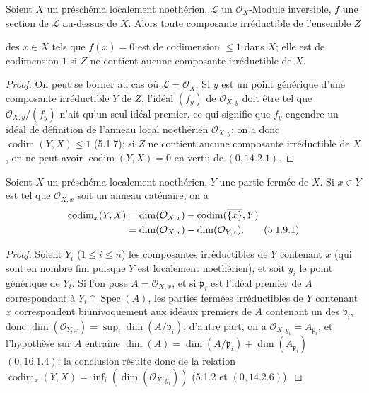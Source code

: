\begin{corollary}[5.1.8]
\label{IV.2.5.1.8-fr}
Soient $X$ un préschéma localement noethérien, $\mathcal L$ un
$\mathcal O_X$-Module inversible, $f$ une section de $\mathcal L$ au-dessus
de $X$. Alors toute composante irréductible de l'ensemble $Z$


des $x\in X$ tels que $f(x)=0$ est de codimension $\leq1$ dans $X$; elle est
de codimension $1$ si $Z$ ne contient aucune composante irréductible de $X$.
\end{corollary}

\begin{proof}
On peut se borner au cas où $\mathcal L=\mathcal O_X$. Si $y$ est un point
générique d'une composante irréductible $Y$ de $Z$, l'idéal $(f_y)$ de
$\mathcal O_{X,y}$ doit être tel que $\mathcal O_{X,y}/(f_y)$ n'ait qu'un
seul idéal premier, ce qui signifie que $f_y$ engendre un idéal de définition
de l'anneau local noethérien $\mathcal O_{X,y}$; on a donc
$\operatorname{codim}(Y,X)\leq1$ (5.1.7); si $Z$ ne contient aucune
composante irréductible de $X$, on ne peut avoir
$\operatorname{codim}(Y,X)=0$ en vertu de $(0,14.2.1)$.
\end{proof}

\begin{proposition}[5.1.9]
\label{IV.2.5.1.9-fr}
Soient $X$ un préschéma localement noethérien, $Y$ une partie fermée de $X$.
Si $x\in Y$ est tel que $\mathcal O_{X,x}$ soit un anneau caténaire, on a
\begin{align}
\operatorname{codim}_x(Y,X)
&=\dim(\mathcal O_{X,x})-\operatorname{codim}(\overline{\{x\}},Y)\notag\\
&=\dim(\mathcal O_{X,x})-\dim(\mathcal O_{Y,x}).
\tag{5.1.9.1}\label{IV.2.5.1.9.1-fr}
\end{align}
\end{proposition}

\begin{proof}
Soient $Y_i$ ($1\leq i\leq n$) les composantes irréductibles de $Y$
contenant $x$ (qui sont en nombre fini puisque $Y$ est localement
noethérien), et soit $y_i$ le point générique de $Y_i$. Si l'on pose
$A=\mathcal O_{X,x}$, et si $\mathfrak p_i$ est l'idéal premier de $A$
correspondant à $Y_i\cap\operatorname{Spec}(A)$, les parties fermées
irréductibles de $Y$ contenant $x$ correspondent biunivoquement aux idéaux
premiers de $A$ contenant un des $\mathfrak p_i$, donc
$\dim(\mathcal O_{Y,x})=\sup_i\dim(A/\mathfrak p_i)$; d'autre part, on a
$\mathcal O_{X,y_i}=A_{\mathfrak p_i}$, et l'hypothèse sur $A$ entraîne
$\dim(A)=\dim(A/\mathfrak p_i)+\dim(A_{\mathfrak p_i})$ $(0,16.1.4)$; la
conclusion résulte donc de la relation
$\operatorname{codim}_x(Y,X)=\inf_i(\dim(\mathcal O_{X,y_i}))$ (5.1.2 et
$(0,14.2.6)$).
\end{proof}

